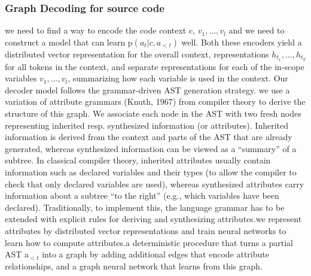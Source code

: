 \documentclass{article}
\begin{document}
\subsubsection{Graph Decoding for source code}
we need to find a way to encode the code context c, $v_1, . . . , v_l$ and we need to construct a model that can learn p$(a_t | c,a_{<t})$ well. Both these encoders yield a distributed vector representation for the overall context, representations $h_{t_1} , . . . , h_{t_T}$ for all tokens in the context, and separate representations for each of the in-scope variables $v_1, . . . , v_l$, summarizing how each variable is used in the context.  Our decoder model follows the grammar-driven AST generation strategy. we use a variation of attribute grammars (Knuth, 1967) from compiler theory to derive the structure of this graph. We associate each node in the AST with two fresh nodes representing inherited resp. synthesized information (or attributes). Inherited information is derived from the context and parts of the AST that are already generated, whereas synthesized information can be viewed as a “summary” of a subtree. In classical compiler theory, inherited attributes usually contain information such as declared variables and their types (to allow the compiler to check that only declared variables are used), whereas synthesized attributes carry information about a subtree “to the right” (e.g., which variables have been declared). Traditionally, to implement this, the language grammar has to be extended with explicit rules for deriving and synthesizing attributes.we represent attributes by distributed vector representations and train neural networks to learn how to compute attributes.a deterministic procedure that turns a partial AST a$_{<t}$ into a graph by adding additional edges that encode attribute relationships, and a graph neural network that learns from this graph.
\end{document}
